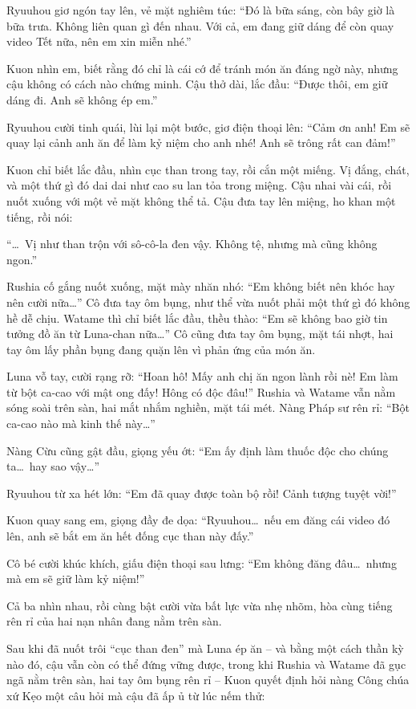 \documentclass[../main.tex]{subfiles}
\begin{document}
Ryuuhou giơ ngón tay lên, vẻ mặt nghiêm túc: ``Đó là bữa sáng, còn bây giờ là bữa trưa. Không liên quan gì đến nhau. Với cả, em đang giữ dáng để còn quay video Tết nữa, nên em xin miễn nhé.''

Kuon nhìn em, biết rằng đó chỉ là cái cớ để tránh món ăn đáng ngờ này, nhưng cậu không có cách nào chứng minh. Cậu thở dài, lắc đầu: ``Được thôi, em giữ dáng đi. Anh sẽ không ép em.''

Ryuuhou cười tinh quái, lùi lại một bước, giơ điện thoại lên: ``Cảm ơn anh! Em sẽ quay lại cảnh anh ăn để làm kỷ niệm cho anh nhé! Anh sẽ trông rất can đảm!''

Kuon chỉ biết lắc đầu, nhìn cục than trong tay, rồi cắn một miếng. Vị đắng, chát, và một thứ gì đó dai dai như cao su lan tỏa trong miệng. Cậu nhai vài cái, rồi nuốt xuống với một vẻ mặt không thể tả. Cậu đưa tay lên miệng, ho khan một tiếng, rồi nói:

``\dots\ Vị như than trộn với sô-cô-la đen vậy. Không tệ, nhưng mà cũng không ngon.''

Rushia cố gắng nuốt xuống, mặt mày nhăn nhó: ``Em không biết nên khóc hay nên cười nữa\dots'' Cô đưa tay ôm bụng, như thể vừa nuốt phải một thứ gì đó không hề dễ chịu. Watame thì chỉ biết lắc đầu, thều thào: ``Em sẽ không bao giờ tin tưởng đồ ăn từ Luna-chan nữa\dots'' Cô cũng đưa tay ôm bụng, mặt tái nhợt, hai tay ôm lấy phần bụng đang quặn lên vì phản ứng của món ăn.

Luna vỗ tay, cười rạng rỡ: ``Hoan hô! Mấy anh chị ăn ngon lành rồi nè! Em làm từ bột ca-cao với mật ong đấy! Hông có độc đâu!'' Rushia và Watame vẫn nằm sóng soài trên sàn, hai mắt nhắm nghiền, mặt tái mét. Nàng Pháp sư rên rỉ: ``Bột ca-cao nào mà kinh thế này\dots''

Nàng Cừu cũng gật đầu, giọng yếu ớt: ``Em ấy định làm thuốc độc cho chúng ta\dots\ hay sao vậy\dots''

Ryuuhou từ xa hét lớn: ``Em đã quay được toàn bộ rồi! Cảnh tượng tuyệt vời!''

Kuon quay sang em, giọng đầy đe dọa: ``Ryuuhou\dots\ nếu em đăng cái video đó lên, anh sẽ bắt em ăn hết đống cục than này đấy.''

Cô bé cười khúc khích, giấu điện thoại sau lưng: ``Em không đăng đâu\dots\ nhưng mà em sẽ giữ làm kỷ niệm!''

Cả ba nhìn nhau, rồi cùng bật cười vừa bất lực vừa nhẹ nhõm, hòa cùng tiếng rên rỉ của hai nạn nhân đang nằm trên sàn.

\omk

Sau khi đã nuốt trôi ``cục than đen'' mà Luna ép ăn – và bằng một cách thần kỳ nào đó, cậu vẫn còn có thể đứng vững được, trong khi Rushia và Watame đã gục ngã nằm trên sàn, hai tay ôm bụng rên rỉ – Kuon quyết định hỏi nàng Công chúa xứ Kẹo một câu hỏi mà cậu đã ấp ủ từ lúc nếm thử:
\end{document}
